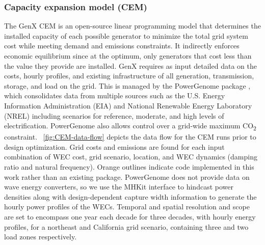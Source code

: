 \documentclass[10pt,twoside]{article}
\begin{document}
\subsubsection{Capacity expansion model (CEM)}
The GenX CEM \cite{bonaldo_genxprojectgenxjl_2025} is an open-source linear programming model that determines the installed capacity of each possible generator to minimize the total grid system cost while meeting demand and emissions constraints.
It indirectly enforces economic equilibrium since at the optimum, only generators that cost less than the value they provide are installed.
GenX requires as input detailed data on the costs, hourly profiles, and existing infrastructure of all generation, transmission, storage, and load on the grid.
This is managed by the PowerGenome package \cite{schivley_powergenomepowergenome_2025}, which consolidates data from multiple sources such as the U.S. Energy Information Administration (EIA) and National Renewable Energy Laboratory (NREL) including scenarios for reference, moderate, and high levels of electrification.
PowerGenome also allows control over a grid-wide maximum CO\textsubscript{2} constraint.
\figureautorefname~\ref{fig:CEM-data-flow} depicts the data flow for the CEM runs prior to design optimization.
Grid costs and emissions are found for each input combination of WEC cost, grid scenario, location, and WEC dynamics (damping ratio and natural frequency).
Orange outlines indicate code implemented in this work rather than an existing package.
PowerGenome does not provide data on wave energy converters, so we use the MHKit interface to hindcast power densities \cite{klise_mhkit_2020} along with design-dependent capture width information to generate the hourly power profiles of the WECs. 
Temporal and spatial resolution and scope are set to encompass one year each decade for three decades, with hourly energy profiles, for a northeast and California grid scenario, containing three and two load zones respectively.
\end{document}
